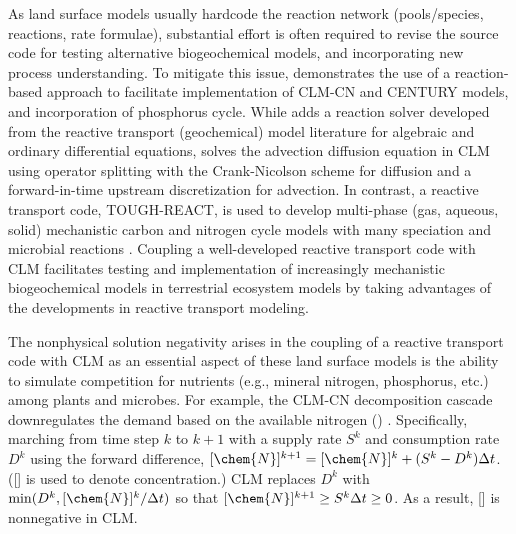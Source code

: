\documentclass[gmd, manuscript]{copernicus}
\begin{document}
As land surface models usually hardcode the reaction network (pools/species,
reactions, rate formulae), substantial effort is often required to revise the
source code for testing alternative biogeochemical models, and incorporating new
process understanding. To mitigate this issue, \citet{Fang2013} demonstrates
the use of a reaction-based approach to facilitate implementation of CLM-CN and
CENTURY models, and incorporation of phosphorus cycle. While \citet{Fang2013}
adds a reaction solver developed from the reactive transport (geochemical)
model literature for algebraic and ordinary differential equations,
\citet{Tang2013b} solves the advection diffusion equation in CLM using operator
splitting with the Crank-Nicolson scheme for diffusion and a forward-in-time
upstream discretization for advection. In contrast, a reactive transport code,
TOUGH-REACT, is used to develop multi-phase (gas, aqueous, solid) mechanistic
carbon and nitrogen cycle models with many speciation and microbial reactions
\citep{Maggi2008,Gu2010,Riley2014}. Coupling a well-developed reactive
transport code \citep[e.g.,][]{Steefel2014} with CLM facilitates testing
and implementation of increasingly mechanistic biogeochemical models in
terrestrial ecosystem models by taking advantages of the developments in
reactive transport modeling.


The nonphysical solution negativity arises in the coupling of a reactive transport code
with CLM as an essential aspect of these land surface models is the ability to simulate
competition for nutrients (e.g., mineral nitrogen, phosphorus, etc.) among
plants and microbes. For example, the CLM-CN decomposition cascade
downregulates the demand based on the available nitrogen ()
\citep{Oleson2013,Thornton2005,Tang2015}. Specifically, marching from time step $k$ to
$k+1$ with a supply rate $S^k$ and consumption rate $D^k$ using the forward
difference, $[\chem{N}]^{k+1} = [\chem{N}]^k + (S^k - D^k) \Delta t$. ([] is
used to denote concentration.) CLM replaces $D^k$ with $\min(D^k,
[\chem{N}]^k/\Delta t)$ so that $[\chem{N}]^{k+1} \geq S^k \Delta t \geq 0$. As
a result, [] is nonnegative in CLM.
 
\end{document}
